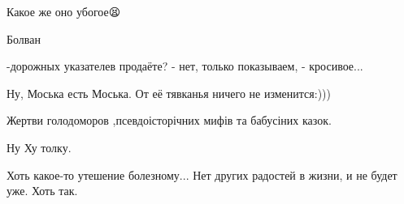 \begin{itemize}
 
Какое же оно убогое😫

 
Болван

 
-дорожных указателев продаёте? - нет, только показываем, - кросивое...

 
Ну, Моська есть Моська. От её тявканья ничего не изменится:)))

 
Жертви голодоморов ,псевдоісторічних мифів та бабусіних казок.

 
Ну Ху толку.

 
Хоть какое-то утешение болезному...
Нет других радостей в жизни, и не будет уже. Хоть так.


\end{itemize}
